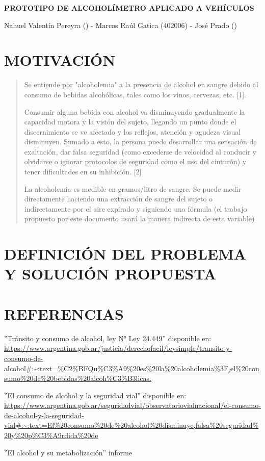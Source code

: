 \documentclass[a4paper,11pt]{article}
\title{}
\author{}
\date{}
\begin{document}
	\begin{center}
		\textbf{\fontsize{15pt}{17pt}\selectfont PROTOTIPO DE ALCOHOLÍMETRO APLICADO A VEHÍCULOS}
		
		Nahuel Valentín Pereyra () - Marcos Raúl Gatica (402006) - José Prado ()
		
	\end{center}
	
	\begin{multicols}{2}
		
		\section{MOTIVACIÓN}
			\begin{quotation}
				Se entiende por "alcoholemia" a la presencia de alcohol en sangre debido al consumo de bebidas alcohólicas, tales como los vinos, cervezas, etc. [1]. 
				
				Consumir alguna bebida con alcohol va disminuyendo gradualmente la capacidad motora y la visión del sujeto, llegando un punto donde el discernimiento se ve afectado y los reflejos, atención y agudeza visual disminuyen. Sumado a esto, la persona puede desarrollar una sensación de exaltación, dar falsa seguridad (como excederse de velocidad al conducir y olvidarse o ignorar protocolos de seguridad como el uso del cinturón) y tener dificultades en su inhibición. [2]
				
				La alcoholemia es medible en gramos/litro de sangre. Se puede medir directamente haciendo una extracción de sangre del sujeto o indirectamente por el aire expirado y siguiendo una fórmula (el trabajo propuesto por este documento usará la manera indirecta de esta variable)
			\end{quotation}
		
		
		\section{DEFINICIÓN DEL PROBLEMA Y SOLUCIÓN PROPUESTA}
		
		\section{REFERENCIAS}
			\begin{thebibliography}{9}
				
				''Tránsito y consumo de alcohol, ley N° Ley 24.449'' disponible en: \url{https://www.argentina.gob.ar/justicia/derechofacil/leysimple/transito-y-consumo-de-alcohol#:~:text=%C2%BFQu%C3%A9%20es%20la%20alcoholemia%3F,el%20consumo%20de%20bebidas%20alcoh%C3%B3licas.}
				
				''El consumo de alcohol y la seguridad vial'' disponible en: \url{https://www.argentina.gob.ar/seguridadvial/observatoriovialnacional/el-consumo-de-alcohol-y-la-seguridad-vial#:~:text=El%20consumo%20de%20alcohol%20disminuye,falsa%20seguridad%20y%20p%C3%A9rdida%20de}
				
				''El alcohol y su metabolización'' informe 
				
			\end{thebibliography}
		
	\end{multicols}
	
\end{document}
